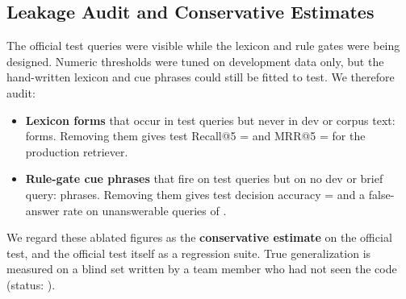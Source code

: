 \documentclass[12pt,a4paper]{article}
\begin{document}
\subsection{Leakage Audit and Conservative Estimates}
\label{sec:leakage}
The official test queries were visible while the lexicon and rule gates were being designed. Numeric thresholds were tuned on
development data only, but the hand-written lexicon and cue phrases could still be fitted to test. We therefore audit:
\begin{itemize}
  \item \textbf{Lexicon forms} that occur in test queries but never in dev or corpus text: \RLeakForms{} forms. Removing them
        gives test Recall@5 = \RLeakRecallWithout{} and MRR@5 = \RLeakMRRWithout{} for the production retriever.
  \item \textbf{Rule-gate cue phrases} that fire on test queries but on no dev or brief query: \RLeakCues{} phrases. Removing
        them gives test decision accuracy = \textbf{\RCueAccWithout} and a false-answer rate on unanswerable queries of
        \textbf{\RCueFalseWithout}.
\end{itemize}
We regard these ablated figures as the \textbf{conservative estimate} on the official test, and the official test itself as a
regression suite. True generalization is measured on a blind set written by a team member who had not seen the code
(status: \RBlindStatus).

\end{document}
